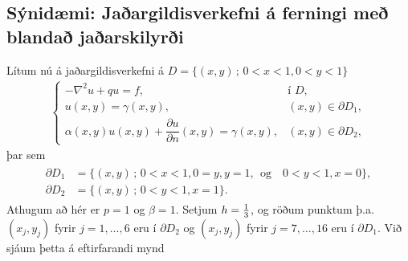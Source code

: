 \documentclass[a4paper,10pt,icelandic]{sphinxmanual}
\begin{document}
\subsection{Sýnidæmi: Jaðargildisverkefni á ferningi með blandað jaðarskilyrði}
\label{\detokenize{Kafli05:synidaemi-jaargildisverkefni-a-ferningi-me-blanda-jaarskilyri}}
Lítum nú á jaðargildisverkefni á \(D=\{(x,y)\,;\, 0<x<1, 0<y<1\}\)
\begin{equation*}
\begin{split}\begin{cases}
-\nabla^2u+qu=f,&\text{í } D,\\
u(x,y)=\gamma(x,y),& (x,y)\in \partial D_1,\\
\alpha(x,y)u(x,y)+\dfrac{\partial u}{\partial n}(x,y)
=\gamma(x,y),& (x,y)\in \partial D_2,
\end{cases}\end{split}
\end{equation*}
þar sem
\begin{equation*}
\begin{split}\begin{aligned}
\partial D_1  &= \{(x,y)\,;\, 0<x<1, 0=y, y=1,~~ \text{og} \quad 0<y<1, x=0 \},\\
\partial D_2 &= \{(x,y)\,;\, 0<y<1, x=1\}.
\end{aligned}\end{split}
\end{equation*}
Athugum að hér er \(p=1\) og \(\beta=1\).
Setjum \(h={1\over 3}\), og röðum punktum þ.a. \((x_j,y_j)\) fyrir \(j=1,\dots, 6\) eru í \(\partial D_2\) og \((x_j,y_j)\) fyrir \(j=7, \dots, 16\) eru í \(\partial D_1\). Við sjáum þetta á eftirfarandi mynd

\end{document}
